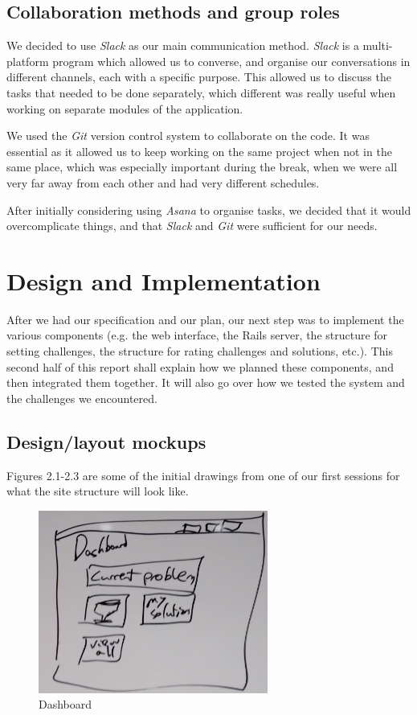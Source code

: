 \documentclass{report}
\begin{document}
\clearpage

\section{Collaboration methods and group roles}
We decided to use \emph{Slack} as our main communication method. \emph{Slack} is a multi-platform program which allowed us to converse, and organise our conversations in different channels, each with a specific purpose. This allowed us to discuss the tasks that needed to be done separately, which different was really useful when working on separate modules of the application.

We used the \emph{Git} version control system to collaborate on the code. It was essential as it allowed us to keep working on the same project when not in the same place, which was especially important during the break, when we were all very far away from each other and had very different schedules.

After initially considering using \emph{Asana} to organise tasks, we decided that it would overcomplicate things, and that \emph{Slack} and \emph{Git} were sufficient for our needs.

\chapter{Design and Implementation}
After we had our specification and our plan, our next step was to implement the various components (e.g. the web interface, the Rails server, the structure for setting challenges, the structure for rating challenges and solutions, etc.). This second half of this report shall explain how we planned these components, and then integrated them together. It will also go over how we tested the system and the challenges we encountered.

\section{Design/layout mockups}
Figures 2.1-2.3 are some of the initial drawings from one of our first sessions for what the site structure will look like.

\begin{figure}[H]
\centerline{\includegraphics[height=6cm]{dashboardMockup}}
\caption{Dashboard}
\end{figure}
\end{document}
